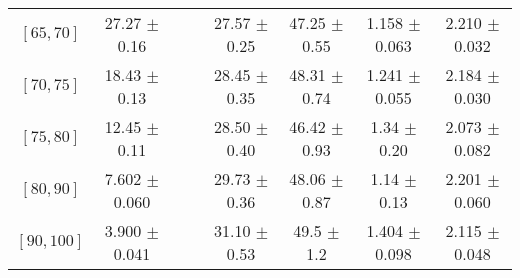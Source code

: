 \begin{tabular}{c||c|c|c|c|c|c|c}
$[65, 70]$ & 27.27 $\pm$ 0.16 &  &  & 27.57 $\pm$ 0.25 & 47.25 $\pm$ 0.55 & 1.158 $\pm$ 0.063 & 2.210 $\pm$ 0.032\\
$[70, 75]$ & 18.43 $\pm$ 0.13 &  &  & 28.45 $\pm$ 0.35 & 48.31 $\pm$ 0.74 & 1.241 $\pm$ 0.055 & 2.184 $\pm$ 0.030\\
$[75, 80]$ & 12.45 $\pm$ 0.11 &  &  & 28.50 $\pm$ 0.40 & 46.42 $\pm$ 0.93 & 1.34 $\pm$ 0.20 & 2.073 $\pm$ 0.082\\
$[80, 90]$ & 7.602 $\pm$ 0.060 &  &  & 29.73 $\pm$ 0.36 & 48.06 $\pm$ 0.87 & 1.14 $\pm$ 0.13 & 2.201 $\pm$ 0.060\\
$[90, 100]$ & 3.900 $\pm$ 0.041 &  &  & 31.10 $\pm$ 0.53 & 49.5 $\pm$ 1.2 & 1.404 $\pm$ 0.098 & 2.115 $\pm$ 0.048\\
\end{tabular}
